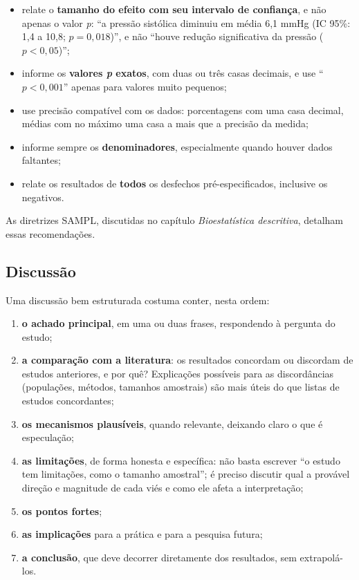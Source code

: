 \documentclass[
]{book}
\providecommand{\tightlist}{%
  \setlength{\itemsep}{0pt}\setlength{\parskip}{0pt}}
\begin{document}
\begin{itemize}
\tightlist
\item
  relate o \textbf{tamanho do efeito com seu intervalo de confiança}, e não apenas o valor \emph{p}: ``a pressão sistólica diminuiu em média 6,1 mmHg (IC 95\%: 1,4 a 10,8; \(p = 0{,}018\))'', e não ``houve redução significativa da pressão (\(p < 0{,}05\))'';
\item
  informe os \textbf{valores \emph{p} exatos}, com duas ou três casas decimais, e use ``\(p < 0{,}001\)'' apenas para valores muito pequenos;
\item
  use precisão compatível com os dados: porcentagens com uma casa decimal, médias com no máximo uma casa a mais que a precisão da medida;
\item
  informe sempre os \textbf{denominadores}, especialmente quando houver dados faltantes;
\item
  relate os resultados de \textbf{todos} os desfechos pré-especificados, inclusive os negativos.
\end{itemize}

As diretrizes SAMPL, discutidas no capítulo \emph{Bioestatística descritiva}, detalham essas recomendações.

\subsection{Discussão}\label{discussuxe3o}

Uma discussão bem estruturada costuma conter, nesta ordem:

\begin{enumerate}
\def\labelenumi{\arabic{enumi}.}
\tightlist
\item
  \textbf{o achado principal}, em uma ou duas frases, respondendo à pergunta do estudo;
\item
  \textbf{a comparação com a literatura}: os resultados concordam ou discordam de estudos anteriores, e por quê? Explicações possíveis para as discordâncias (populações, métodos, tamanhos amostrais) são mais úteis do que listas de estudos concordantes;
\item
  \textbf{os mecanismos plausíveis}, quando relevante, deixando claro o que é especulação;
\item
  \textbf{as limitações}, de forma honesta e específica: não basta escrever ``o estudo tem limitações, como o tamanho amostral''; é preciso discutir qual a provável direção e magnitude de cada viés e como ele afeta a interpretação;
\item
  \textbf{os pontos fortes};
\item
  \textbf{as implicações} para a prática e para a pesquisa futura;
\item
  \textbf{a conclusão}, que deve decorrer diretamente dos resultados, sem extrapolá-los.
\end{enumerate}
\end{document}
